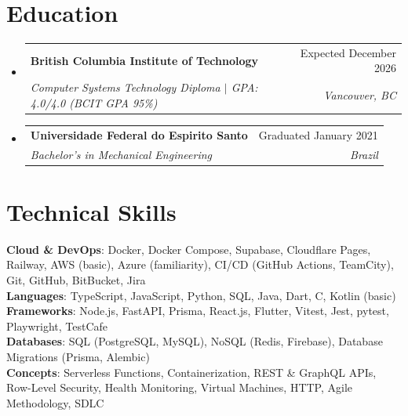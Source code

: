 \documentclass[letterpaper,11pt]{article}
\makeatletter
\newcommand{\resumeSubheading}[4]{
  \vspace{-2pt}\item
    \begin{tabular*}{0.97\textwidth}[t]{l@{\extracolsep{\fill}}r}
      \textbf{#1} & #2 \\
      \textit{\small#3} & \textit{\small #4} \\
    \end{tabular*}\vspace{-7pt}
}
\newcommand{\resumeSubHeadingListStart}{\begin{itemize}[leftmargin=0.15in, label={}]}
\newcommand{\resumeSubHeadingListEnd}{\end{itemize}}
\makeatother
\begin{document}
\section{Education}
  \resumeSubHeadingListStart
    \resumeSubheading
      {British Columbia Institute of Technology}{Expected December 2026}
      {Computer Systems Technology Diploma $|$ \textup{GPA: 4.0/4.0 (BCIT GPA 95\%)}}{Vancouver, BC}
    \resumeSubheading
      {Universidade Federal do Espirito Santo}{Graduated January 2021}
      {Bachelor's in Mechanical Engineering}{Brazil}
  \resumeSubHeadingListEnd

%
\section{Technical Skills}
 \begin{itemize}[leftmargin=0.15in, label={}]
    \small{\item{
     \textbf{Cloud \& DevOps}{: Docker, Docker Compose, Supabase, Cloudflare Pages, Railway, AWS (basic), Azure (familiarity), CI/CD (GitHub Actions, TeamCity), Git, GitHub, BitBucket, Jira} \\
     \textbf{Languages}{: TypeScript, JavaScript, Python, SQL, Java, Dart, C, Kotlin (basic)} \\
     \textbf{Frameworks}{: Node.js, FastAPI, Prisma, React.js, Flutter, Vitest, Jest, pytest, Playwright, TestCafe} \\
     \textbf{Databases}{: SQL (PostgreSQL, MySQL), NoSQL (Redis, Firebase), Database Migrations (Prisma, Alembic)} \\
     \textbf{Concepts}{: Serverless Functions, Containerization, REST \& GraphQL APIs, Row-Level Security, Health Monitoring, Virtual Machines, HTTP, Agile Methodology, SDLC}
    }}
 \end{itemize}


\end{document}
